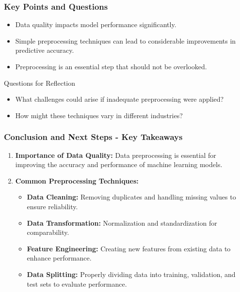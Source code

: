 \documentclass[aspectratio=169]{beamer}
\begin{document}
\begin{frame}[fragile]
    \frametitle{Key Points and Questions}
    \begin{itemize}
        \item Data quality impacts model performance significantly.
        \item Simple preprocessing techniques can lead to considerable improvements in predictive accuracy.
        \item Preprocessing is an essential step that should not be overlooked.
    \end{itemize}
    \begin{block}{Questions for Reflection}
        \begin{itemize}
            \item What challenges could arise if inadequate preprocessing were applied?
            \item How might these techniques vary in different industries?
        \end{itemize}
    \end{block}
\end{frame}

\begin{frame}[fragile]
  \frametitle{Conclusion and Next Steps - Key Takeaways}
  
  \begin{enumerate}
    \item \textbf{Importance of Data Quality:} 
      Data preprocessing is essential for improving the accuracy and performance of machine learning models.
    \item \textbf{Common Preprocessing Techniques:}
      \begin{itemize}
        \item \textbf{Data Cleaning:} Removing duplicates and handling missing values to ensure reliability.
        \item \textbf{Data Transformation:} Normalization and standardization for comparability.
        \item \textbf{Feature Engineering:} Creating new features from existing data to enhance performance.
        \item \textbf{Data Splitting:} Properly dividing data into training, validation, and test sets to evaluate performance.
      \end{itemize}
  \end{enumerate}
  
\end{frame}
\end{document}
